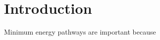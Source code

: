 \documentclass[11pt]{report}
\begin{document}
    

    \chapter*{Introduction}
    Minimum energy pathways are important because\textellipsis
\end{document}
